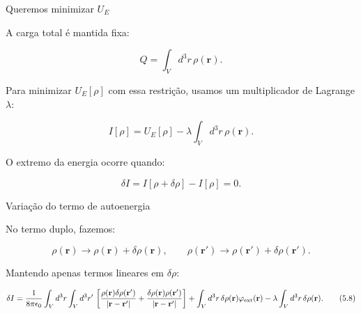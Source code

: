 \documentclass[aspectratio=169]{beamer}
\begin{document}
\begin{frame}{Queremos minimizar $U_E$}

\small

A carga total é mantida fixa:

\[
Q=\int_V d^3r\,\rho(\mathbf r).
\]

Para minimizar \(U_E[\rho]\) com essa restrição, usamos um multiplicador de
Lagrange \(\lambda\):

\begin{eqbox}
\begin{equation}
I[\rho]
=
U_E[\rho]
-
\lambda
\int_V d^3r\,\rho(\mathbf r).
\tag{5.6}
\label{eq:funcional-lagrange}
\end{equation}
\end{eqbox}

O extremo da energia ocorre quando:

\begin{eqbox}
\begin{equation}
\delta I
=
I[\rho+\delta\rho]
-
I[\rho]
=
0.
\tag{5.7}
\label{eq:variacao-zero}
\end{equation}
\end{eqbox}

\end{frame}

\begin{frame}{Variação do termo de autoenergia}

\small

No termo duplo, fazemos:

\[
\rho(\mathbf r)\to \rho(\mathbf r)+\delta\rho(\mathbf r),
\qquad
\rho(\mathbf r')\to \rho(\mathbf r')+\delta\rho(\mathbf r').
\]

Mantendo apenas termos lineares em \(\delta\rho\):

\begin{eqbox}
\begin{equation}
\delta I
=
\frac{1}{8\pi\epsilon_0}
\int_V d^3r
\int_V d^3r'\,
\left[
\frac{\rho(\mathbf r)\delta\rho(\mathbf r')}
{|\mathbf r-\mathbf r'|}
+
\frac{\delta\rho(\mathbf r)\rho(\mathbf r')}
{|\mathbf r-\mathbf r'|}
\right]
+
\int_V d^3r\,\delta\rho(\mathbf r)\varphi_{\rm ext}(\mathbf r)
-
\lambda
\int_V d^3r\,\delta\rho(\mathbf r).
\tag{5.8}
\label{eq:variacao-I}
\end{equation}
\end{eqbox}

\end{frame}
\end{document}
